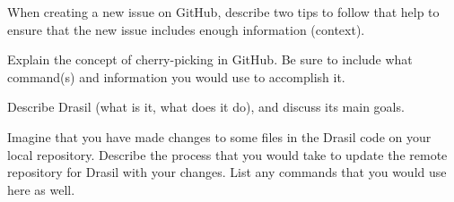 \documentclass[12pt,fleqn]{examtst}
\begin{document}

\newpage
\noindent
\begin{minipage}{\textwidth}

When creating a new issue on GitHub, describe two tips to follow that help to ensure that the new issue includes enough information (context).

\rule{0cm}{7cm}

Explain the concept of cherry-picking in GitHub. Be sure to include what command(s) and information you would use to accomplish it.

\rule{0cm}{7cm}

\end{minipage}


\newpage
\noindent
\begin{minipage}{\textwidth}

Describe Drasil (what is it, what does it do), and discuss its main goals.

\rule{0cm}{7cm}

Imagine that you have made changes to some files in the Drasil code on your local repository. Describe the process that you would take to update the remote repository for Drasil with your changes. List any commands that you would use here as well.

\rule{0cm}{7cm}

\end{minipage}
\end{document}
